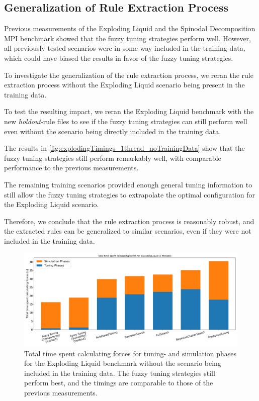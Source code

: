 \newpage

\subsection{Generalization of Rule Extraction Process}

Previous measurements of the Exploding Liquid and the Spinodal Decomposition MPI benchmark showed that the fuzzy tuning strategies perform well. However, all previously tested scenarios were in some way included in the training data, which could have biased the results in favor of the fuzzy tuning strategies.

To investigate the generalization of the rule extraction process, we reran the rule extraction process without the Exploding Liquid scenario being present in the training data.

To test the resulting impact, we reran the Exploding Liquid benchmark with the new \emph{holdout}-rule files to see if the fuzzy tuning strategies can still perform well even without the scenario being directly included in the training data.

The results in \autoref{fig:explodingTimings_1thread_noTrainingData} show that the fuzzy tuning strategies still perform remarkably well, with comparable performance to the previous measurements.

The remaining training scenarios provided enough general tuning information to still allow the fuzzy tuning strategies to extrapolate the optimal configuration for the Exploding Liquid scenario.

Therefore, we conclude that the rule extraction process is reasonably robust, and the extracted rules can be generalized to similar scenarios, even if they were not included in the training data.

\begin{figure}[H]
    \centering
    \includegraphics[width=\columnwidth,trim={0cm 0 0cm 0.9cm},clip]{figures/Benchmark/ExplodingLiquidHoldout/total_time_explodingLiquid_1.png}
    \caption[
        Benchmark Results for the Exploding Liquid Scenario (Holdout)
    ]{
        Total time spent calculating forces for tuning- and simulation phases for the Exploding Liquid benchmark without the scenario being included in the training data. The fuzzy tuning strategies still perform best, and the timings are comparable to those of the previous measurements.
    }
    \label{fig:explodingTimings_1thread_noTrainingData}
\end{figure}